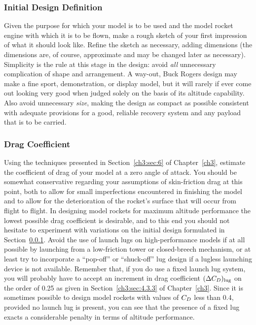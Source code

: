 \subsubsection{Initial Design Definition}\label{ch4:sec:5.2.1}

Given the purpose for which your model is to be used and the model rocket engine with which it is
to be flown, make a rough sketch of your first impression of what it should look like. Refine the
sketch as necessary, adding dimensions (the dimensions are, of course, approximate and may be
changed later as necessary). Simplicity is the rule at this stage in the design: avoid \emph{all}
unnecessary complication of shape and arrangement. A way-out, Buck Rogers design may make a fine
sport, demonstration, or display model, but it will rarely if ever come out looking very good when
judged solely on the basis of its altitude capability. Also avoid unnecessary \emph{size}, making
the design as compact as possible consistent with adequate provisions for a good, reliable recovery
system and any payload that is to be carried.

\subsubsection{Drag Coefficient}\label{ch4:sec:5.2.2}

Using the techniques presented in Section~\ref{ch3:sec:6} of Chapter~\ref{ch3}, estimate the
coefficient of drag of your model at a zero angle of attack. You should be somewhat conservative
regarding your assumptions of skin-friction drag at this point, both to allow for small
imperfections encountered in finishing the model and to allow for the deterioration of the
rocket's surface that will occur from flight to flight. In designing model rockets for maximum
altitude performance the lowest possible drag coefficient is desirable, and to this end you should
not hesitate to experiment with variations on the initial design formulated in
Section~\ref{ch4:sec:5.2.1}. Avoid the use of launch lugs on high-performance models if at all
possible by launching from a low-friction tower or closed-breech mechanism, or at least try to
incorporate a ``pop-off'' or ``shuck-off'' lug design if a lugless launching device is not
available. Remember that, if you do use a fixed launch lug system, you will probably have to accept
an increment in drag coefficient $(\Delta C_{D})_{\mathrm{lug}}$ on the order of 0.25 as given in
Section~\ref{ch3:sec:4.3.3} of Chapter~\ref{ch3}. Since it is sometimes possible to design model
rockets with values of $C_{D}$ less than 0.4, provided no launch lug is present, you can see that the
presence of a fixed lug exacts a considerable penalty in terms of altitude performance.

